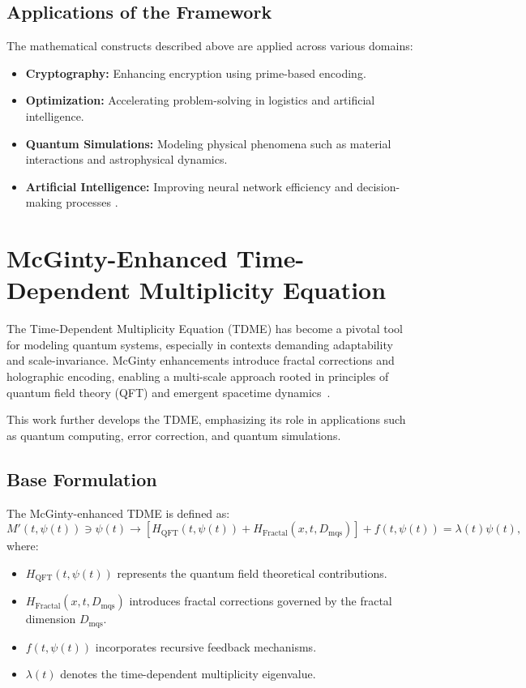 \documentclass{article}
\theoremstyle{plain}
\begin{document}
\subsection{Applications of the Framework}
The mathematical constructs described above are applied across various domains:
\begin{itemize}
    \item \textbf{Cryptography:} Enhancing encryption using prime-based encoding.
    \item \textbf{Optimization:} Accelerating problem-solving in logistics and artificial intelligence.
    \item \textbf{Quantum Simulations:} Modeling physical phenomena such as material interactions and astrophysical dynamics.
    \item \textbf{Artificial Intelligence:} Improving neural network efficiency and decision-making processes \cite{biamonte2017tensor}.
\end{itemize}

\section{McGinty-Enhanced Time-Dependent Multiplicity Equation}

The Time-Dependent Multiplicity Equation (TDME) has become a pivotal tool for modeling quantum systems, especially in contexts demanding adaptability and scale-invariance. McGinty enhancements introduce fractal corrections and holographic encoding, enabling a multi-scale approach rooted in principles of quantum field theory (QFT) and emergent spacetime dynamics~\cite{McGintyEquation2024, Bekenstein1973, Maldacena1999}. 

This work further develops the TDME, emphasizing its role in applications such as quantum computing, error correction, and quantum simulations.

\subsection{Base Formulation}
The McGinty-enhanced TDME is defined as:
\begin{equation}
    M'(t, \psi(t)) \ni \psi(t) \rightarrow \left[ H_{\text{QFT}}(t, \psi(t)) + H_{\text{Fractal}}(x, t, D_{\text{mqs}}) \right] + f(t, \psi(t)) = \lambda(t) \psi(t),
\end{equation}
where:
\begin{itemize}
    \item \(H_{\text{QFT}}(t, \psi(t))\) represents the quantum field theoretical contributions.
    \item \(H_{\text{Fractal}}(x, t, D_{\text{mqs}})\) introduces fractal corrections governed by the fractal dimension \(D_{\text{mqs}}\).
    \item \(f(t, \psi(t))\) incorporates recursive feedback mechanisms.
    \item \(\lambda(t)\) denotes the time-dependent multiplicity eigenvalue.
\end{itemize}
\end{document}
